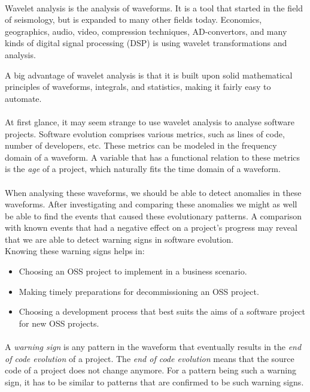 \paragraph{}
Wavelet analysis is the analysis of waveforms. It is a tool that started in the
field of seismology, but is expanded to many other fields today. Economics,
geographics, audio, video, compression techniques, AD-convertors, and many kinds
of digital signal processing (DSP) is using wavelet transformations and
analysis.

A big advantage of wavelet analysis is that it is built upon solid mathematical
principles of waveforms, integrals, and statistics, making it fairly easy to
automate.

\paragraph{}
At first glance, it may seem strange to use wavelet analysis to analyse software
projects. Software evolution comprises various metrics, such as lines of code,
number of developers, etc. These metrics can be modeled in the frequency domain
of a waveform. A variable that has a functional relation to these
metrics is the \emph{age }\rm of a project, which naturally fits the time domain
of a waveform.

\paragraph{}
When analysing these waveforms, we should be able to detect anomalies in
these waveforms. After investigating and comparing these anomalies we might as
well be able to find the events that caused these evolutionary patterns. A
comparison with known events that had a negative effect on a project's progress
may reveal that we are able to detect warning signs in software evolution.\\

\noindent
Knowing these warning signs helps in:
\begin{itemize}
	\item Choosing an OSS project to implement in a business scenario.
	\item Making timely preparations for decommissioning an OSS project.
	\item Choosing a development process that best suits the aims of a software
	project for new OSS projects.
\end{itemize}

\paragraph{}
A \emph{warning sign }\rm is any pattern in the waveform that eventually results
in the \emph{end of code evolution }\rm of a project. The \emph{end of code
evolution }\rm means that the source code of a project does not change anymore.
For a pattern being such a warning sign, it has to be similar to patterns that
are confirmed to be such warning signs.

